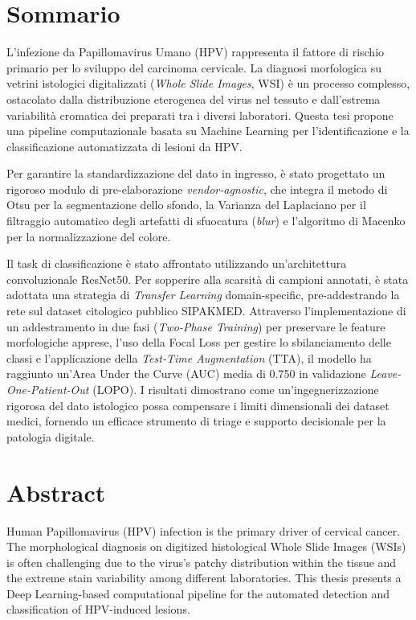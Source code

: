 
\chapter*{Sommario}

L'infezione da Papillomavirus Umano (HPV) rappresenta il fattore di rischio primario per lo sviluppo del carcinoma cervicale. La diagnosi morfologica su vetrini istologici digitalizzati (\textit{Whole Slide Images}, WSI) è un processo complesso, ostacolato dalla distribuzione eterogenea del virus nel tessuto e dall'estrema variabilità cromatica dei preparati tra i diversi laboratori. Questa tesi propone una pipeline computazionale basata su Machine Learning per l'identificazione e la classificazione automatizzata di lesioni da HPV.

Per garantire la standardizzazione del dato in ingresso, è stato progettato un rigoroso modulo di pre-elaborazione \textit{vendor-agnostic}, che integra il metodo di Otsu per la segmentazione dello sfondo, la Varianza del Laplaciano per il filtraggio automatico degli artefatti di sfuocatura (\textit{blur}) e l'algoritmo di Macenko per la normalizzazione del colore. 

Il task di classificazione è stato affrontato utilizzando un'architettura convoluzionale ResNet50. Per sopperire alla scarsità di campioni annotati, è stata adottata una strategia di \textit{Transfer Learning} domain-specific, pre-addestrando la rete sul dataset citologico pubblico SIPAKMED. Attraverso l'implementazione di un addestramento in due fasi (\textit{Two-Phase Training}) per preservare le feature morfologiche apprese, l'uso della Focal Loss per gestire lo sbilanciamento delle classi e l'applicazione della \textit{Test-Time Augmentation} (TTA), il modello ha raggiunto un'Area Under the Curve (AUC) media di 0.750 in validazione \textit{Leave-One-Patient-Out} (LOPO). I risultati dimostrano come un'ingegnerizzazione rigorosa del dato istologico possa compensare i limiti dimensionali dei dataset medici, fornendo un efficace strumento di triage e supporto decisionale per la patologia digitale.

\clearpage 


\chapter*{Abstract}

Human Papillomavirus (HPV) infection is the primary driver of cervical cancer. The morphological diagnosis on digitized histological Whole Slide Images (WSIs) is often challenging due to the virus's patchy distribution within the tissue and the extreme stain variability among different laboratories. This thesis presents a Deep Learning-based computational pipeline for the automated detection and classification of HPV-induced lesions.

